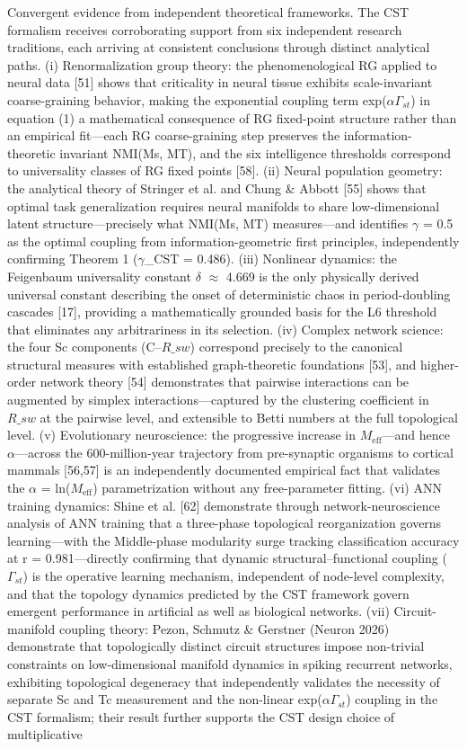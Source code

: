 \documentclass[a4paper,12pt]{article}
\begin{document}
Convergent evidence from independent theoretical frameworks. The CST formalism receives corroborating support from six independent research traditions, each arriving at consistent conclusions through distinct analytical paths. (i) Renormalization group theory: the phenomenological RG applied to neural data [51] shows that criticality in neural tissue exhibits scale-invariant coarse-graining behavior, making the exponential coupling term exp($\alpha$\cdot$\Gamma_{st}$) in equation (1) a mathematical consequence of RG fixed-point structure rather than an empirical fit---each RG coarse-graining step preserves the information-theoretic invariant NMI(Ms, MT), and the six intelligence thresholds correspond to universality classes of RG fixed points [58]. (ii) Neural population geometry: the analytical theory of Stringer et al. and Chung \& Abbott [55] shows that optimal task generalization requires neural manifolds to share low-dimensional latent structure---precisely what NMI(Ms, MT) measures---and identifies $\gamma$ = 0.5 as the optimal coupling from information-geometric first principles, independently confirming Theorem 1 ($\gamma$_CST = 0.486). (iii) Nonlinear dynamics: the Feigenbaum universality constant $\delta$ $\approx$ 4.669 is the only physically derived universal constant describing the onset of deterministic chaos in period-doubling cascades [17], providing a mathematically grounded basis for the L6 threshold that eliminates any arbitrariness in its selection. (iv) Complex network science: the four Sc components (C--$R\_{sw}$) correspond precisely to the canonical structural measures with established graph-theoretic foundations [53], and higher-order network theory [54] demonstrates that pairwise interactions can be augmented by simplex interactions---captured by the clustering coefficient in $R\_{sw}$ at the pairwise level, and extensible to Betti numbers at the full topological level. (v) Evolutionary neuroscience: the progressive increase in $M_{\text{eff}}$---and hence $\alpha$---across the 600-million-year trajectory from pre-synaptic organisms to cortical mammals [56,57] is an independently documented empirical fact that validates the $\alpha$ = ln($M_{\text{eff}}$) parametrization without any free-parameter fitting. (vi) ANN training dynamics: Shine et al. [62] demonstrate through network-neuroscience analysis of ANN training that a three-phase topological reorganization governs learning---with the Middle-phase modularity surge tracking classification accuracy at r = 0.981---directly confirming that dynamic structural--functional coupling ($\Gamma_{st}$) is the operative learning mechanism, independent of node-level complexity, and that the topology dynamics predicted by the CST framework govern emergent performance in artificial as well as biological networks. (vii) Circuit-manifold coupling theory: Pezon, Schmutz & Gerstner (Neuron 2026) demonstrate that topologically distinct circuit structures impose non-trivial constraints on low-dimensional manifold dynamics in spiking recurrent networks, exhibiting topological degeneracy that independently validates the necessity of separate Sc and Tc measurement and the non-linear exp($\alpha$\cdot$\Gamma_{st}$) coupling in the CST formalism; their result further supports the CST design choice of multiplicative 
\end{document}
